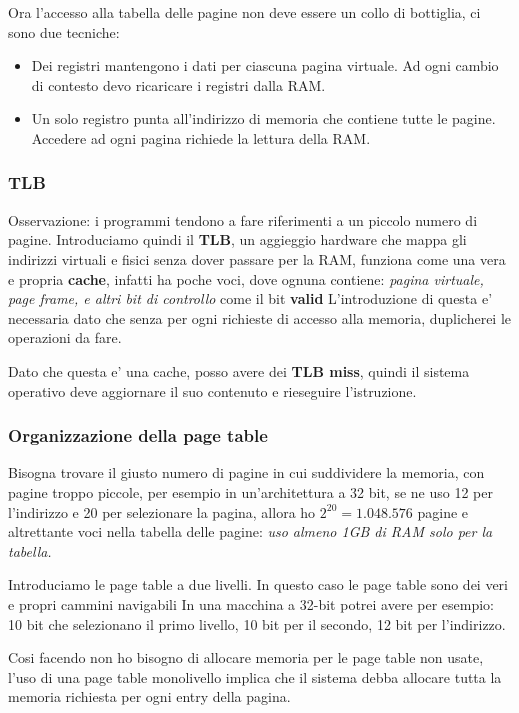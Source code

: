     Ora l'accesso alla tabella delle pagine non deve essere un collo di bottiglia, ci sono due tecniche:
    \begin{itemize}
        \item Dei registri mantengono i dati per ciascuna pagina virtuale. Ad ogni cambio di contesto devo ricaricare i registri dalla RAM.
        \item Un solo registro punta all'indirizzo di memoria che contiene tutte le pagine. Accedere ad ogni pagina richiede la lettura della RAM.
    \end{itemize}

    \subsubsection{TLB}
        Osservazione: i programmi tendono a fare riferimenti a un piccolo numero di pagine. Introduciamo quindi il \textbf{TLB},
        un aggieggio hardware che mappa gli indirizzi virtuali e fisici senza dover passare per la RAM, funziona
        come una vera e propria \textbf{cache}, infatti ha poche voci, dove ognuna contiene: \textit{pagina virtuale, page frame, e altri bit di controllo} come il bit \textbf{valid}
        L'introduzione di questa e' necessaria dato che senza per ogni richieste di accesso alla memoria, duplicherei le operazioni da fare.

        Dato che questa e' una cache, posso avere dei \textbf{TLB miss}, quindi il sistema operativo deve aggiornare
        il suo contenuto e rieseguire l'istruzione.

    \subsubsection{Organizzazione della page table}
        Bisogna trovare il giusto numero di pagine in cui suddividere la memoria, con pagine troppo piccole, per esempio
        in un'architettura a 32 bit, se ne uso 12 per l'indirizzo e 20 per selezionare la pagina, allora ho $2^20=1.048.576$ pagine e altrettante
        voci nella tabella delle pagine: \textit{uso almeno 1GB di RAM solo per la tabella.}

        Introduciamo le page table a due livelli. In questo caso le page table sono dei veri e propri cammini navigabili
        In una macchina a 32-bit potrei avere per esempio: 10 bit che selezionano il primo livello, 10 bit per il secondo, 12 bit per l'indirizzo.

        Cosi facendo non ho bisogno di allocare memoria per le page table non usate, l'uso di una page
        table monolivello  implica che il sistema debba allocare tutta la memoria richiesta per ogni entry della pagina.


